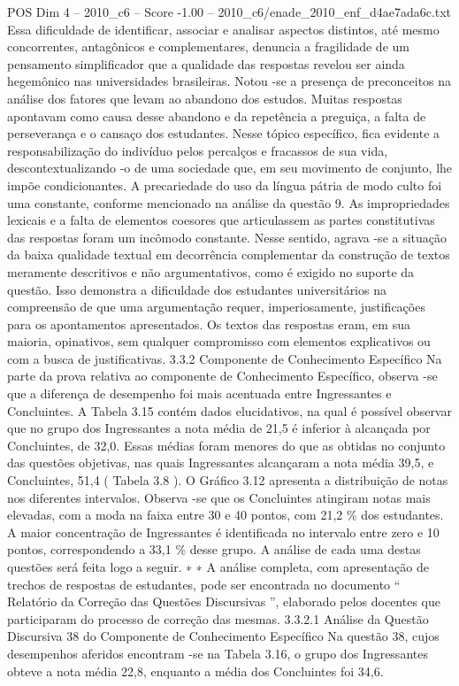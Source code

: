 \begin{textsample}{POS Dim 4 – 2010\_c6 – Score -1.00 – 2010\_c6/enade\_2010\_enf\_d4ae7ada6c.txt}
Essa dificuldade de identificar, associar e analisar aspectos distintos, até mesmo concorrentes, antagônicos e complementares, denuncia a fragilidade de um pensamento simplificador que a qualidade das respostas revelou ser ainda hegemônico nas universidades brasileiras.
Notou -se a presença de preconceitos na análise dos fatores que levam ao abandono dos estudos.
Muitas respostas apontavam como causa desse abandono e da repetência a preguiça, a falta de perseverança e o cansaço dos estudantes.
Nesse tópico específico, fica evidente a responsabilização do indivíduo pelos percalços e fracassos de sua vida, descontextualizando -o de uma sociedade que, em seu movimento de conjunto, lhe impõe condicionantes.
A precariedade do uso da língua pátria de modo culto foi uma constante, conforme mencionado na análise da questão 9.
As impropriedades lexicais e a falta de elementos coesores que articulassem as partes constitutivas das respostas foram um incômodo constante.
Nesse sentido, agrava -se a situação da baixa qualidade textual em decorrência complementar da construção de textos meramente descritivos e não argumentativos, como é exigido no suporte da questão.
Isso demonstra a dificuldade dos estudantes universitários na compreensão de que uma argumentação requer, imperiosamente, justificações para os apontamentos apresentados.
Os textos das respostas eram, em sua maioria, opinativos, sem qualquer compromisso com elementos explicativos ou com a busca de justificativas. 3.3.2 Componente de Conhecimento Específico Na parte da prova relativa ao componente de Conhecimento Específico, observa -se que a diferença de desempenho foi mais acentuada entre Ingressantes e Concluintes.
A Tabela 3.15 contém dados elucidativos, na qual é possível observar que no grupo dos Ingressantes a nota média de 21,5 é inferior à alcançada por Concluintes, de 32,0.
Essas médias foram menores do que as obtidas no conjunto das questões objetivas, nas quais Ingressantes alcançaram a nota média 39,5, e Concluintes, 51,4 ( Tabela 3.8 ).
O Gráfico 3.12 apresenta a distribuição de notas nos diferentes intervalos.
Observa -se que os Concluintes atingiram notas mais elevadas, com a moda na faixa entre 30 e 40 pontos, com 21,2 \% dos estudantes.
A maior concentração de Ingressantes é identificada no intervalo entre zero e 10 pontos, correspondendo a 33,1 \% desse grupo.
A análise de cada uma destas questões será feita logo a seguir. ∗ ∗ A análise completa, com apresentação de trechos de respostas de estudantes, pode ser encontrada no documento “ Relatório da Correção das Questões Discursivas ”, elaborado pelos docentes que participaram do processo de correção das mesmas. 3.3.2.1 Análise da Questão Discursiva 38 do Componente de Conhecimento Específico Na questão 38, cujos desempenhos aferidos encontram -se na Tabela 3.16, o grupo dos Ingressantes obteve a nota média 22,8, enquanto a média dos Concluintes foi 34,6.

\end{textsample}
